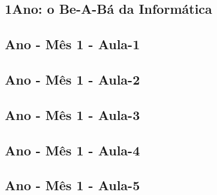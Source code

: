 \color{black}
\begin{multicols}{2}
\chapter[ 1\textordmasculine\space Ano: o Be-A-B\'{a} da Inform\'{a}tica]{1\textordmasculine\space Ano: o Be-A-B\'{a} da Inform\'{a}tica}


\pagebreak

%
%
%
%
%
%
%
%

\pagebreak

	\section[\sffamily 1\textordmasculine\space Ano - M\^{e}s 1 - Aula-1]{\textordmasculine\space Ano - M\^{e}s 1 - Aula-1}


\section[\sffamily 1\textordmasculine\space Ano - M\^{e}s 1 - Aula-2]{\textordmasculine\space Ano - M\^{e}s 1 - Aula-2}


\section[\sffamily 1\textordmasculine\space Ano - M\^{e}s 1 - Aula-3]{\textordmasculine\space Ano - M\^{e}s 1 - Aula-3}


\section[\sffamily 1\textordmasculine\space Ano - M\^{e}s 1 - Aula-4]{\textordmasculine\space Ano - M\^{e}s 1 - Aula-4}


\section[\sffamily 1\textordmasculine\space Ano - M\^{e}s 1 - Aula-5]{\textordmasculine\space Ano - M\^{e}s 1 - Aula-5}



\end{multicols}

